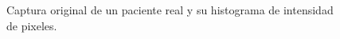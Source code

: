 \begin{figure}[ht!]
        \hspace{-0.6cm}
         \hspace{0.1cm}        
  \caption{Captura original de un paciente real y su histograma de intensidad de pixeles.}
      \label{abelhistposta}
\end{figure}

